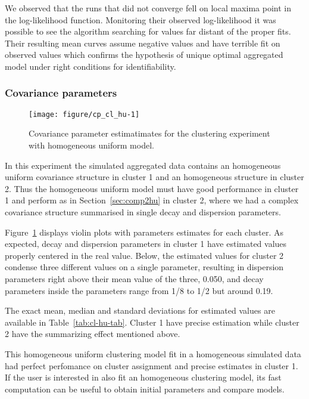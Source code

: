 We observed that the runs that did not converge fell on local maxima point in the log-likelihood function. Monitoring their observed log-likelihood it was possible to see the algorithm searching for values far distant of the proper fits. Their resulting mean curves assume negative values and have terrible fit on observed values which confirms the hypothesis of unique optimal aggregated model under right conditions for identifiability.

\subsubsection{Covariance parameters}
\label{sec:simu-cl-covar-hu}


\begin{figure}[t]
  \centering
\begin{knitrout}
\color{fgcolor}
\texttt{[image: figure/cp\_cl\_hu-1]} 

\end{knitrout}
\caption{Covariance parameter estimatimates for the clustering experiment with homogeneous uniform model.}
\label{fig:cl-par-hu}
\end{figure}

In this experiment the simulated aggregated data contains an homogeneous uniform covariance structure in cluster 1 and an homogeneous structure in cluster 2. Thus the homogeneous uniform model must have good performance in cluster 1 and perform as in Section~\ref{sec:comp2hu} in cluster 2, where we had a complex covariance structure summarised in single decay and dispersion parameters.

Figure~\ref{fig:cl-par-hu} displays violin plots with parameters estimates for each cluster. As expected, decay and dispersion parameters in cluster 1 have estimated values properly centered in the real value. Below, the estimated values for cluster 2 condense three different values on a single parameter, resulting in dispersion parameters right above their mean value of the three, 0.050, and decay parameters inside the parameters range from 1/8 to 1/2 but around 0.19.

The exact mean, median and standard deviations for estimated values are available in Table~\ref{tab:cl-hu-tab}. Cluster 1 have precise estimation while cluster 2 have the summarizing effect mentioned above.

This homogeneous uniform clustering model fit in a homogeneous simulated data had perfect perfomance on cluster assignment and precise estimates in cluster 1. If the user is interested in also fit an homogeneous clustering model, its fast computation can be useful to obtain initial parameters and compare models.


